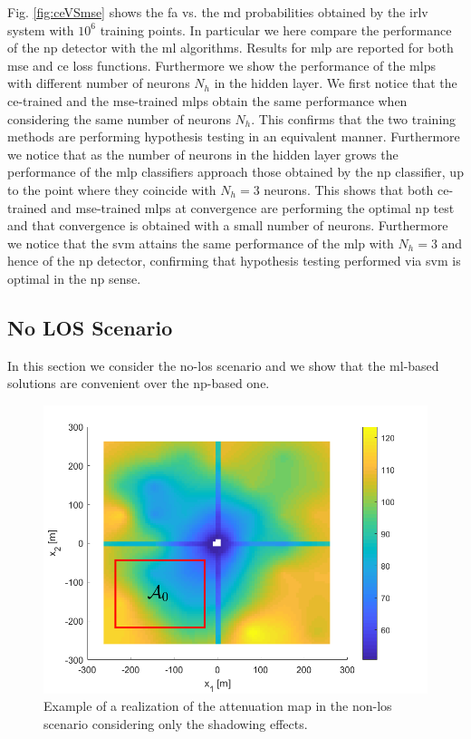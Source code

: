 \documentclass[draftcls,onecolumn,12pt]{IEEEtran}
\begin{document}
Fig. \ref{fig:ceVSmse} shows the \ac{fa} vs. the \ac{md} probabilities obtained by the \ac{irlv} system with $10^6$ training points. In particular we here compare the performance of the \ac{np} detector with the \ac{ml} algorithms. Results for \ac{mlp} are reported for both \ac{mse} and \ac{ce} loss functions. Furthermore we show the performance of the \acp{mlp} with different number of neurons $N_h$ in the hidden layer. We first notice that the \ac{ce}-trained and the \ac{mse}-trained \acp{mlp} obtain the same performance when considering the same number of neurons $N_h$. This confirms that the two training methods are performing hypothesis testing in an equivalent manner. Furthermore we notice that as the number of neurons in the hidden layer grows the performance of the \ac{mlp} classifiers approach those obtained by the \ac{np} classifier, up to the point where they coincide with $N_h=3$ neurons. This shows that both \ac{ce}-trained and \ac{mse}-trained \acp{mlp} at convergence are performing the optimal \ac{np} test and that convergence is obtained with a small number of neurons. Furthermore we notice that the \ac{svm} attains the same performance of the \ac{mlp} with $N_h = 3$ and hence of the \ac{np} detector, confirming that hypothesis testing performed via \ac{svm} is optimal in the \ac{np} sense.




\subsection{No LOS Scenario}\label{sec:res_nLos}
In this section we consider the no-\ac{los} scenario and we show that the \ac{ml}-based solutions are convenient over the \ac{np}-based one.

\begin{figure}[t]
    \centering
    \includegraphics[width=0.5\columnwidth]{surfColorato.png}
    \caption{Example of a realization of the attenuation map in the non-\ac{los} scenario considering only the shadowing effects.}
    \label{fig:map}
\end{figure}
\end{document}
